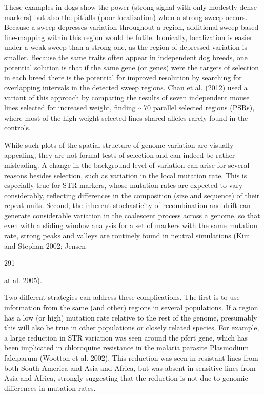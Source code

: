 \documentclass{article}
\begin{document}
These examples in dogs show the power (strong signal with only modestly dense markers) but also the pitfalls (poor localization) when a strong sweep occurs. Because a sweep depresses variation throughout a region, additional sweep-based fine-mapping within this region would be futile. Ironically, localization is easier under a weak sweep than a strong one, as the region of depressed variation is smaller. Because the same traits often appear in independent dog breeds, one potential solution is that if the same gene (or genes) were the targets of selection in each breed there is the potential for improved resolution by searching for overlapping intervals in the detected sweep regions. Chan et al. (2012) used a variant of this approach by comparing the results of seven independent mouse lines selected for increased weight, finding  $ \sim $70 parallel selected regions (PSRs), where most of the high-weight selected lines shared alleles rarely found in the controls.

While such plots of the spatial structure of genome variation are visually appealing, they are not formal tests of selection and can indeed be rather misleading. A change in the background level of variation can arise for several reasons besides selection, such as variation in the local mutation rate. This is especially true for STR markers, whose mutation rates are expected to vary considerably, reflecting differences in the composition (size and sequence) of their repeat units. Second, the inherent stochasticity of recombination and drift can generate considerable variation in the coalescent process across a genome, so that even with a sliding window analysis for a set of markers with the same mutation rate, strong peaks and valleys are routinely found in neutral simulations (Kim and Stephan 2002; Jensen

291

at al. 2005).

Two different strategies can address these complications. The first is to use information from the same (and other) regions in several populations. If a region has a low (or high) mutation rate relative to the rest of the genome, presumably this will also be true in other populations or closely related species. For example, a large reduction in STR variation was seen around the pfcrt gene, which has been implicated in chloroquine resistance in the malaria parasite Plasmodium falciparum (Wootton et al. 2002). This reduction was seen in resistant lines from both South America and Asia and Africa, but was absent in sensitive lines from Asia and Africa, strongly suggesting that the reduction is not due to genomic differences in mutation rates.
\end{document}
